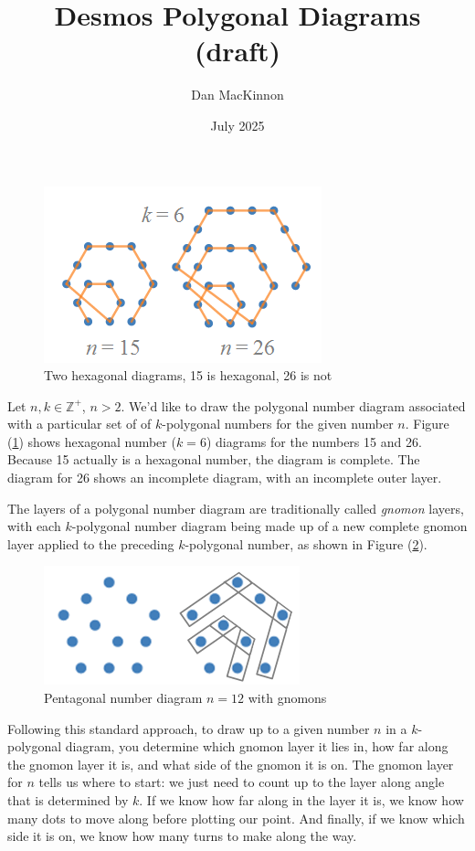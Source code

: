 \documentclass{article}
\title{Desmos Polygonal Diagrams (draft)}
\author{Dan MacKinnon}
\date{July 2025}
\begin{document}
\maketitle

\begin{figure}[!ht]
    \centering
    \includegraphics[width=0.5\linewidth]{hexagonal_and_no.PNG}
    \caption{Two hexagonal diagrams, 15 is hexagonal, 26 is not}
    \label{fig:hexagonals}
\end{figure}

Let $n,k \in \mathbb{Z}^{+}$, $n > 2$. We'd like to draw the polygonal number diagram associated with a particular set of of $k$-polygonal numbers for the given number $n$. Figure (\ref{fig:hexagonals}) shows hexagonal number ($k = 6$) diagrams for the numbers 15 and 26. Because 15 actually is a hexagonal number, the diagram is complete. The diagram for 26 shows an incomplete diagram, with an incomplete outer layer.

The layers of a polygonal number diagram are traditionally called \textit{gnomon} layers, with each $k$-polygonal number diagram being made up of a new complete gnomon layer applied to the preceding $k$-polygonal number, as shown in Figure (\ref{fig:gnomons}).

\begin{figure}
    \centering
    \includegraphics[width=0.5\linewidth]{pentagon_with_gnomon.PNG}
    \caption{Pentagonal number diagram $n=12$ with gnomons}
    \label{fig:gnomons}
\end{figure}


Following this standard approach, to draw up to a given number $n$ in a $k$-polygonal diagram, you determine which gnomon layer it lies in, how far along the gnomon layer it is, and what side of the gnomon it is on. The gnomon layer for $n$ tells us where to start: we just need to count up to the layer along angle that is determined by $k$. If we know how far along in the layer it is, we know how many dots to move along before plotting our point. And finally, if we know which side it is on, we know how many turns to make along the way.
\end{document}
